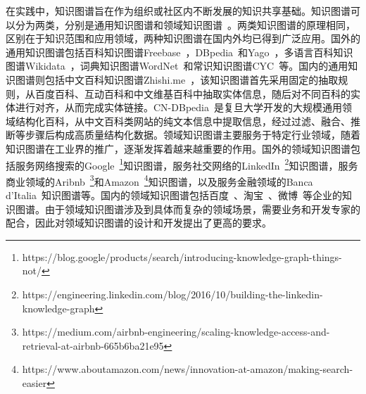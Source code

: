 \documentclass[algorithmlist, AutoFakeBold, AutoFakeSlant, figurelist, tablelist, nomlist, masters]{seuthesix}
\begin{document}
在实践中，知识图谱旨在作为组织或社区内不断发展的知识共享基础。知识图谱可以分为两类，分别是通用知识图谱和领域知识图谱~\cite{hogan2021knowledge}。两类知识图谱的原理相同，区别在于知识范围和应用领域，两种知识图谱在国内外均已得到广泛应用。国外的通用知识图谱包括百科知识图谱Freebase~\cite{bollacker2007platform}，DBpedia~\cite{lehmann2015dbpedia}和Yago~\cite{hoffart2011yago2}，多语言百科知识图谱Wikidata~\cite{vrandevcic2014wikidata}，词典知识图谱WordNet~\cite{miller2007wordnet}和常识知识图谱CYC~\cite{lenat1995cyc}等。国内的通用知识图谱则包括中文百科知识图谱Zhishi.me~\cite{niu2011zhishi}，该知识图谱首先采用固定的抽取规则，从百度百科、互动百科和中文维基百科中抽取实体信息，随后对不同百科的实体进行对齐，从而完成实体链接。CN-DBpedia~\cite{xu2017cn}是复旦大学开发的大规模通用领域结构化百科，从中文百科类网站的纯文本信息中提取信息，经过过滤、融合、推断等步骤后构成高质量结构化数据。领域知识图谱主要服务于特定行业领域，随着知识图谱在工业界的推广，逐渐发挥着越来越重要的作用。国外的领域知识图谱包括服务网络搜索的Google~\footnote{https://blog.google/products/search/introducing-knowledge-graph-things-not/}知识图谱，服务社交网络的LinkedIn~\footnote{https://engineering.linkedin.com/blog/2016/10/building-the-linkedin-knowledge-graph}知识图谱，服务商业领域的Aribnb~\footnote{https://medium.com/airbnb-engineering/scaling-knowledge-access-and-retrieval-at-airbnb-665b6ba21e95}和Amazon~\footnote{https://www.aboutamazon.com/news/innovation-at-amazon/making-search-easier}知识图谱，以及服务金融领域的Banca d’Italia~\cite{bellomarini2019knowledge}知识图谱等。国内的领域知识图谱包括百度~\cite{wang2013xlore}、淘宝~\cite{xu2021alime}、微博~\cite{wei2020analysis}等企业的知识图谱。由于领域知识图谱涉及到具体而复杂的领域场景，需要业务和开发专家的配合，因此对领域知识图谱的设计和开发提出了更高的要求。
\end{document}
